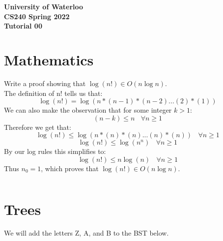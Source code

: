 \documentclass[12pt]{article}
\begin{document}
\begin{center}
{\Large\bf University of Waterloo}\\
\vspace{3mm}
{\Large\bf CS240 Spring 2022}\\
\vspace{2mm}
{\Large\bf Tutorial 00}
\end{center}

\def\question#1{\item[\bf #1.]}
\def\part#1{\item[\bf #1)]}
\newcommand{\pc}[1]{\mbox{\textbf{#1}}}


\section{Mathematics}

Write a proof showing that $\log(n!) \in O(n \log n)$. \\

The definition of n! tells us that:
\[ \log(n!) = \log(n*(n-1)*(n-2)...(2)*(1)) \]
We can also make the observation that for some integer $k>1$:
\[  (n-k) \leq n \ \ \ \ \forall n \geq 1 \]
Therefore we get that:
\[ \log(n!) \leq \log(n*(n)*(n)...(n)*(n)) \ \ \ \ \forall n \geq 1 \]
\[ \log(n!) \leq \log(n^n) \ \ \ \ \forall n \geq 1 \]
By our log rules this simplifies to:
\[ \log(n!) \leq n\log(n) \ \ \ \ \forall n \geq 1 \]
Thus $n_0 = 1$, which proves that $\log(n!) \in O(n \log n)$.


\[ \] \[ \] \[ \] \[ \]
\section{Trees}
We will add the letters Z, A, and B to the BST below. \\
\begin{center}\end{center}
\end{document}
